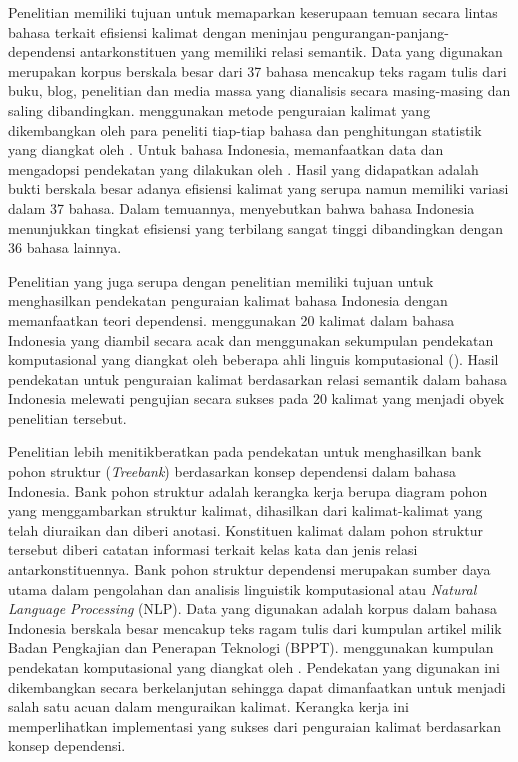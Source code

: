 Penelitian \cite{futrell2015large} memiliki tujuan untuk memaparkan keserupaan temuan secara lintas bahasa terkait efisiensi kalimat dengan meninjau \gls{pengurangan-panjang-dependensi} antarkonstituen yang memiliki relasi semantik. Data yang digunakan merupakan korpus berskala besar dari 37 bahasa mencakup teks ragam tulis dari buku, blog, penelitian dan media massa yang dianalisis secara masing-masing dan saling dibandingkan. \cite{futrell2015large} menggunakan metode penguraian kalimat yang dikembangkan oleh para peneliti tiap-tiap bahasa dan penghitungan statistik yang diangkat oleh \cite{gelman2007data}. Untuk bahasa Indonesia, \cite{futrell2015large} memanfaatkan data dan mengadopsi pendekatan yang dilakukan oleh \cite{green2012indonesian}. Hasil yang didapatkan adalah bukti berskala besar adanya efisiensi kalimat yang serupa namun memiliki variasi dalam 37 bahasa. Dalam temuannya, \cite{futrell2015large} menyebutkan bahwa bahasa Indonesia menunjukkan tingkat efisiensi yang terbilang sangat tinggi dibandingkan dengan 36 bahasa lainnya. 

Penelitian \cite{green2012indonesian} yang juga serupa dengan penelitian \cite{kamayani2011dependency} memiliki tujuan untuk menghasilkan pendekatan penguraian kalimat bahasa Indonesia dengan memanfaatkan teori dependensi. \cite{kamayani2011dependency} menggunakan 20 kalimat dalam bahasa Indonesia yang diambil secara acak dan menggunakan sekumpulan pendekatan komputasional yang diangkat oleh beberapa ahli linguis komputasional (\citealp{nivre2006dependency, covington2001fundamental, de2008stanford, de2014universal}). Hasil pendekatan untuk penguraian kalimat berdasarkan relasi semantik dalam bahasa Indonesia melewati pengujian secara sukses pada 20 kalimat yang menjadi obyek penelitian tersebut.

Penelitian \cite{green2012indonesian} lebih menitikberatkan pada pendekatan untuk menghasilkan bank pohon struktur (\textit{Treebank}) berdasarkan konsep dependensi dalam bahasa Indonesia. Bank pohon struktur adalah kerangka kerja berupa diagram pohon yang menggambarkan struktur kalimat, dihasilkan dari kalimat-kalimat yang telah diuraikan dan diberi anotasi. Konstituen kalimat dalam pohon struktur tersebut diberi catatan informasi terkait kelas kata dan jenis relasi antarkonstituennya. Bank pohon struktur dependensi merupakan sumber daya utama dalam pengolahan dan analisis linguistik komputasional atau \textit{Natural Language Processing} (NLP). Data yang digunakan adalah korpus dalam bahasa Indonesia berskala besar mencakup teks ragam tulis dari kumpulan artikel milik Badan Pengkajian dan Penerapan Teknologi (BPPT). \cite{green2012indonesian} menggunakan kumpulan pendekatan komputasional yang diangkat oleh \cite{kubler2009dependency}. Pendekatan yang digunakan \cite{green2012indonesian} ini dikembangkan secara berkelanjutan sehingga dapat dimanfaatkan untuk menjadi salah satu acuan dalam menguraikan kalimat. Kerangka kerja ini memperlihatkan implementasi yang sukses dari penguraian kalimat berdasarkan konsep dependensi.

